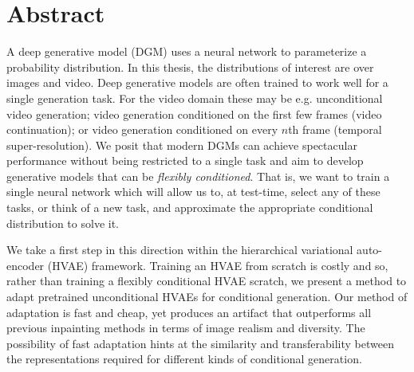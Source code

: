 
\chapter{Abstract}







A deep generative model (DGM) uses a neural network to parameterize a probability distribution. In this thesis, the distributions of interest are over images and video. Deep generative models are often trained to work well for a single generation task. For the video domain these may be e.g. unconditional video generation; video generation conditioned on the first few frames (\ie video continuation); or video generation conditioned on every $n$th frame (\ie temporal super-resolution). We posit that modern DGMs can achieve spectacular performance without being restricted to a single task and aim to develop generative models that can be \textit{flexibly conditioned}. That is, we want to train a single neural network which will allow us to, at test-time, select any of these tasks, or think of a new task, and approximate the appropriate conditional distribution to solve it.

We take a first step in this direction within the hierarchical variational auto-encoder (HVAE) framework. Training an HVAE from scratch is costly and so, rather than training a flexibly conditional HVAE scratch, we present a method to adapt pretrained unconditional HVAEs for conditional generation. Our method of adaptation is fast and cheap, yet produces an artifact that outperforms all previous inpainting methods in terms of image realism and diversity. The possibility of fast adaptation hints at the similarity and transferability between the representations required for different kinds of conditional generation.

